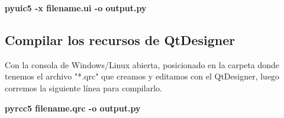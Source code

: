 \begin{center}
    \textbf{pyuic5 -x filename.ui -o output.py}
\end{center}

\subsection{Compilar los recursos de QtDesigner}
Con la consola de Windows/Linux abierta, posicionado en la carpeta donde tenemos el archivo "*.qrc" que creamos y editamos con el QtDesigner,
luego corremos la siguiente l\'inea para compilarlo.

\begin{center}
    \textbf{pyrcc5 filename.qrc -o output.py}
\end{center}
